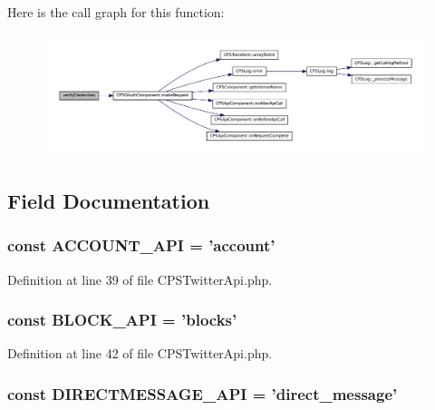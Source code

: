 Here is the call graph for this function:\nopagebreak
\begin{figure}[H]
\begin{center}
\leavevmode
\includegraphics[width=400pt]{classCPSTwitterApi_aa706fde11e1968f76a5ed19056944fdc_cgraph}
\end{center}
\end{figure}




\subsection{Field Documentation}
\hypertarget{classCPSTwitterApi_a57a7ce6c04940622a290e914976de849}{
\subsubsection[{ACCOUNT\_\-API}]{\setlength{\rightskip}{0pt plus 5cm}const {\bf ACCOUNT\_\-API} = 'account'}}
\label{classCPSTwitterApi_a57a7ce6c04940622a290e914976de849}


Definition at line 39 of file CPSTwitterApi.php.

\hypertarget{classCPSTwitterApi_ab4c32fba74b8441eb0d1497398718f80}{
\subsubsection[{BLOCK\_\-API}]{\setlength{\rightskip}{0pt plus 5cm}const {\bf BLOCK\_\-API} = 'blocks'}}
\label{classCPSTwitterApi_ab4c32fba74b8441eb0d1497398718f80}


Definition at line 42 of file CPSTwitterApi.php.

\hypertarget{classCPSTwitterApi_a7f6433ea3fadbcaed427de7f30fa5aa7}{
\subsubsection[{DIRECTMESSAGE\_\-API}]{\setlength{\rightskip}{0pt plus 5cm}const {\bf DIRECTMESSAGE\_\-API} = 'direct\_\-message'}}
\label{classCPSTwitterApi_a7f6433ea3fadbcaed427de7f30fa5aa7}


